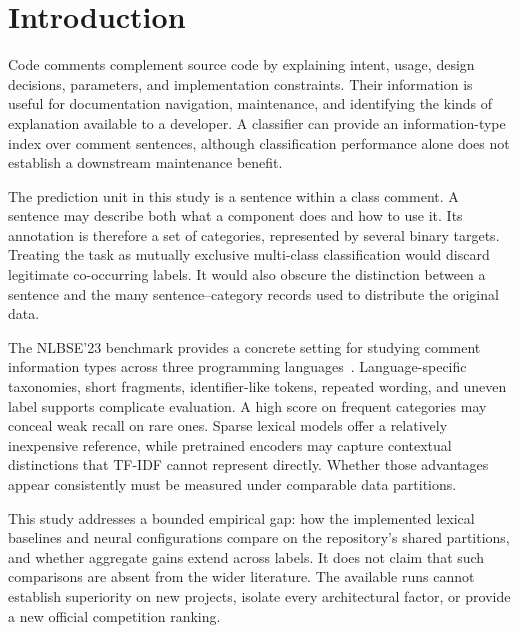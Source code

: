 \section{Introduction}
Code comments complement source code by explaining intent, usage, design decisions, parameters, and implementation constraints. Their information is useful for documentation navigation, maintenance, and identifying the kinds of explanation available to a developer. A classifier can provide an information-type index over comment sentences, although classification performance alone does not establish a downstream maintenance benefit.

The prediction unit in this study is a sentence within a class comment. A sentence may describe both what a component does and how to use it. Its annotation is therefore a set of categories, represented by several binary targets. Treating the task as mutually exclusive multi-class classification would discard legitimate co-occurring labels. It would also obscure the distinction between a sentence and the many sentence--category records used to distribute the original data.

The NLBSE'23 benchmark provides a concrete setting for studying comment information types across three programming languages~\cite{nlbse}. Language-specific taxonomies, short fragments, identifier-like tokens, repeated wording, and uneven label supports complicate evaluation. A high score on frequent categories may conceal weak recall on rare ones. Sparse lexical models offer a relatively inexpensive reference, while pretrained encoders may capture contextual distinctions that TF-IDF cannot represent directly. Whether those advantages appear consistently must be measured under comparable data partitions.

This study addresses a bounded empirical gap: how the implemented lexical baselines and neural configurations compare on the repository's shared partitions, and whether aggregate gains extend across labels. It does not claim that such comparisons are absent from the wider literature. The available runs cannot establish superiority on new projects, isolate every architectural factor, or provide a new official competition ranking.

